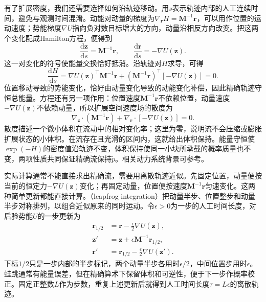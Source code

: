 有了扩展密度，我们还需要选择如何沿轨迹移动。用$s$表示轨迹内部的人工连续时间，避免与观测时间混淆。动能对动量的梯度为$\nabla_{\bm r}H=\bm M^{-1}\bm r$，可以用作位置的运动速度；势能梯度$\nabla U$指向负对数目标增大的方向，动量沿相反方向改变。把这两个变化配成Hamilton方程，便得到
\begin{equation}
  \frac{\mathrm{d}\bm{z}}{\mathrm{d}s}=\bm{M}^{-1}\bm{r},
  \qquad
  \frac{\mathrm{d}\bm{r}}{\mathrm{d}s}=-\nabla U(\bm{z}).
  \label{eq:pgm-sampling-hamilton-equations}
\end{equation}
这一对变化的符号使能量交换恰好抵消。沿轨迹对$H$求导，可得
\[
  \frac{\mathrm dH}{\mathrm ds}
  =\nabla U(\bm z)^{\top}\bm M^{-1}\bm r
   +(\bm M^{-1}\bm r)^{\top}[-\nabla U(\bm z)]
  =0.
\]
位置移动导致的势能变化，恰好由动量变化导致的动能变化补偿，因此精确轨迹守恒总能量。方程还有另一项作用：位置速度$\bm M^{-1}\bm r$不依赖位置，动量速度$-\nabla U(\bm z)$不依赖动量，所以扩展空间速度场的散度为
\[
  \nabla_{\bm z}\!\cdot(\bm M^{-1}\bm r)
  +\nabla_{\bm r}\!\cdot[-\nabla U(\bm z)]=0.
\]
散度描述一个微小体积在流动中的相对变化率；这里为零，说明流不会压缩或膨胀扩展状态的小体积。在流存在且光滑的区间内，这就给出体积保持。能量守恒使$\exp(-H)$的密度值沿轨迹不变，体积保持使同一小块所承载的概率质量也不变，两项性质共同保证精确流保持$\widetilde p$。相关动力系统背景可参考。

实际计算通常不能直接求出精确流，需要用离散轨迹近似。先固定位置，动量便按当前的恒定力$-\nabla U(\bm z)$变化；再固定动量，位置便按速度$\bm M^{-1}\bm r$匀速变化。这两种简单更新都能直接计算。（leapfrog integration）把动量半步、位置整步和动量半步对称排列，以组合近似原来的同时运动。令$\epsilon>0$为一步的人工时间长度，对后验势能$U$的一步更新为
\begin{equation}
  \begin{aligned}
    \bm{r}_{1/2}&=\bm{r}-\frac{\epsilon}{2}\nabla U(\bm{z}),\\
    \bm{z}'&=\bm{z}+\epsilon\bm{M}^{-1}\bm{r}_{1/2},\\
    \bm{r}'&=\bm{r}_{1/2}-\frac{\epsilon}{2}\nabla U(\bm{z}').
  \end{aligned}
  \label{eq:pgm-sampling-leapfrog}
\end{equation}
下标$1/2$只是一步内部的半步标记，两个动量半步各用时$\epsilon/2$，中间位置步用时$\epsilon$。蛙跳通常有能量误差，但在精确算术下保留体积和可逆性，便于下一步作概率校正。固定正整数$L$作为步数，重复上述更新后就得到人工时间长度$\tau=L\epsilon$的离散轨迹。

